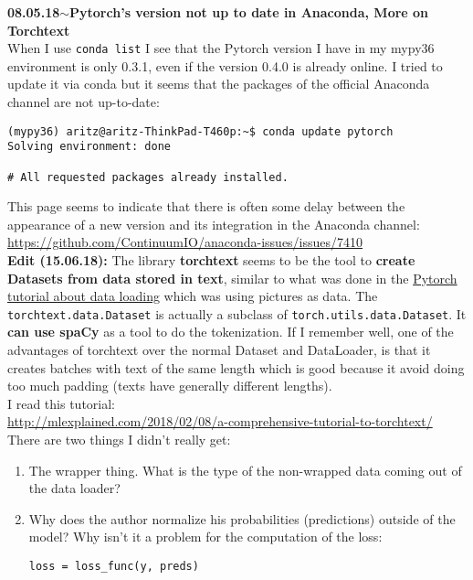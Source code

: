 \documentclass[11pt,a4paper]{article}
\newenvironment{loggentry}[2]%
{\noindent\textbf{#1}\hspace{1cm}$\mathbf{\sim}$\text{ }\textbf{#2}\\}{\vspace{0.5cm}}
\begin{document}
\begin{loggentry}{08.05.18}{Pytorch's version not up to date in Anaconda, More on Torchtext}
When I use \texttt{conda list} I see that the Pytorch version I have in my mypy36 environment is only 0.3.1, even if the version 0.4.0 is already online. I tried to update it via conda but it seems that the packages of the official Anaconda channel are not up-to-date:\\
\begin{verbatim}
(mypy36) aritz@aritz-ThinkPad-T460p:~$ conda update pytorch
Solving environment: done

# All requested packages already installed.
\end{verbatim}
This page seems to indicate that there is often some delay between the appearance of a new version and its integration in the Anaconda channel:\\
\url{https://github.com/ContinuumIO/anaconda-issues/issues/7410}\\

\textbf{Edit (15.06.18):} The library \textbf{torchtext} seems to be the tool to \textbf{create Datasets from data stored in text}, similar to what was done in the \href{https://pytorch.org/tutorials/beginner/data_loading_tutorial.html#sphx-glr-beginner-data-loading-tutorial-py}{Pytorch tutorial about data loading} which was using pictures as data. The \texttt{torchtext.data.Dataset} is actually a subclass of \texttt{torch.utils.data.Dataset}. It \textbf{can use spaCy} as a tool to do the tokenization. If I remember well, one of the advantages of torchtext over the normal Dataset and DataLoader, is that it creates batches with text of the same length which is good because it avoid doing too much padding (texts have generally different lengths).\\
I read this tutorial:\\
\url{http://mlexplained.com/2018/02/08/a-comprehensive-tutorial-to-torchtext/}\\

There are two things I didn't really get:\\
\begin{enumerate}
\item The wrapper thing. What is the type of the non-wrapped data coming out of the data loader?
\item Why does the author normalize his probabilities (predictions) outside of the model? Why isn't it a problem for the computation of the loss:\\
\begin{verbatim}
loss = loss_func(y, preds)
\end{verbatim}
\end{enumerate}
\end{loggentry}
\end{document}
